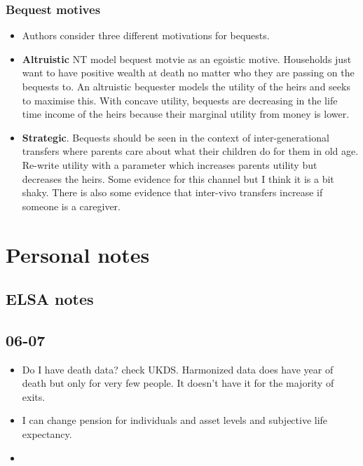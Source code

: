 \documentclass[12pt]{article}
\begin{document}
\subsubsection{Bequest motives}
\begin{itemize}
      \item Authors consider three different motivations for bequests.
      \item \textbf{Altruistic} NT model bequest motvie as an egoistic motive. Households just want to have positive
            wealth at death no matter who they are passing on the bequests to. An altruistic bequester models the utility of the heirs and
            seeks to maximise this. With concave utility, bequests are decreasing in the life time income of the heirs because their marginal
            utility from money is lower.

      \item \textbf{Strategic}. Bequests should be seen in the context of inter-generational transfers where parents care about
            what their children do for them in old age. Re-write utility with a parameter which increases parents utility but decreases the heirs.
            Some evidence for this channel but I think it is a bit shaky. There is also some evidence that inter-vivo transfers increase if someone
            is a caregiver.


\end{itemize}



\section{Personal notes}
\subsection{ELSA notes}

\subsection{\textbf{06-07}}
\begin{itemize}
      \item Do I have death data? check UKDS.
            Harmonized data does have year of death but only for very few
            people. It doesn't have it for the majority of exits.

      \item I can change pension for individuals and asset levels and subjective life expectancy.
      \item

\end{itemize}
\end{document}
